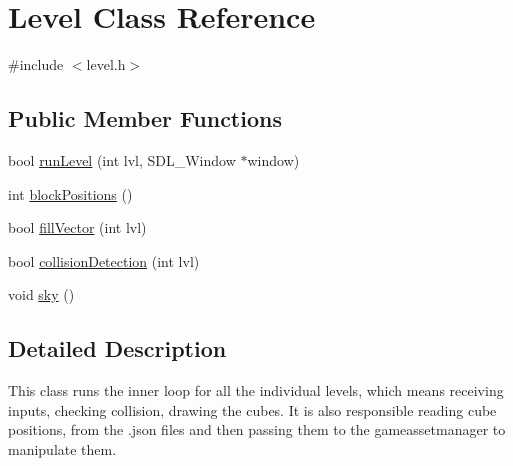 \hypertarget{classLevel}{\section{Level Class Reference}
\label{classLevel}
}


{\ttfamily \#include $<$level.\-h$>$}

\subsection*{Public Member Functions}
\begin{DoxyCompactItemize}
\item 
bool \hyperlink{classLevel_a09cffeaf0d6f4a583f5a83f1a07cd0ad}{run\-Level} (int lvl, S\-D\-L\-\_\-\-Window $\ast$window)
\item 
int \hyperlink{classLevel_a427e559e6b7dab9867c76cef6eab4185}{block\-Positions} ()
\item 
bool \hyperlink{classLevel_a0d16d2fbefe76a3b5e5bcb2ad4e6a6c2}{fill\-Vector} (int lvl)
\item 
bool \hyperlink{classLevel_a8651318bbd27c04e5105e4bc4593173a}{collision\-Detection} (int lvl)
\item 
void \hyperlink{classLevel_a24eeee2748d12fd613ad3fb86b1557d9}{sky} ()
\end{DoxyCompactItemize}


\subsection{Detailed Description}
This class runs the inner loop for all the individual levels, which means receiving inputs, checking collision, drawing the cubes. It is also responsible reading cube positions, from the .json files and then passing them to the gameassetmanager to manipulate them. 

